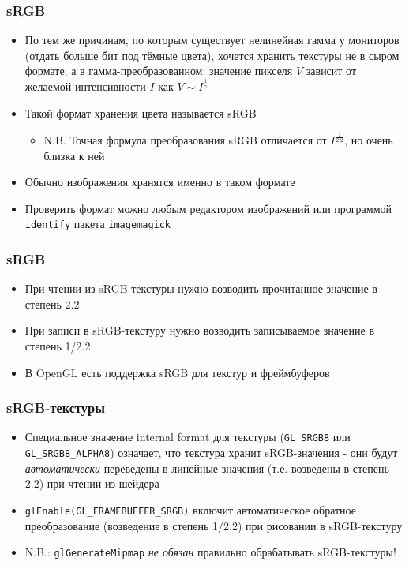 \documentclass{beamer}
\begin{document}
\begin{frame}[fragile]
\frametitle{sRGB}
\begin{itemize}
\item По тем же причинам, по которым существует нелинейная гамма у мониторов (отдать больше бит под тёмные цвета), хочется хранить текстуры не в сыром формате, а в гамма-преобразованном: значение пикселя \begin{math}V\end{math} зависит от желаемой интенсивности \begin{math}I\end{math} как \begin{math}V \sim I^\frac{1}{\gamma}\end{math}
\pause
\item Такой формат хранения цвета называется sRGB
\begin{itemize}
\item N.B. Точная формула преобразования sRGB отличается от \begin{math}I^\frac{1}{2.2}\end{math}, но очень близка к ней
\end{itemize}
\pause
\item Обычно изображения хранятся именно в таком формате
\pause
\item Проверить формат можно любым редактором изображений или программой \verb|identify| пакета \verb|imagemagick|
\end{itemize}
\end{frame}

\begin{frame}[fragile]
\frametitle{sRGB}
\begin{itemize}
\item При чтении из sRGB-текстуры нужно возводить прочитанное значение в степень 2.2
\pause
\item При записи в sRGB-текстуру нужно возводить записываемое значение в степень 1/2.2
\pause
\item В OpenGL есть поддержка sRGB для текстур и фреймбуферов
\end{itemize}
\end{frame}

\begin{frame}[fragile]
\frametitle{sRGB-текстуры}
\begin{itemize}
\item Специальное значение internal format для текстуры (\verb|GL_SRGB8| или \verb|GL_SRGB8_ALPHA8|) означает, что текстура хранит sRGB-значения - они будут \textit{автоматически} переведены в линейные значения (т.е. возведены в степень 2.2) при чтении из шейдера
\pause
\item \verb|glEnable(GL_FRAMEBUFFER_SRGB)| включит автоматическое обратное преобразование (возведение в степень 1/2.2) при рисовании в sRGB-текстуру
\pause
\item {\color{red}N.B.:} \verb|glGenerateMipmap| \textit{не обязан} правильно обрабатывать sRGB-текстуры!
\end{itemize}
\end{frame}
\end{document}
